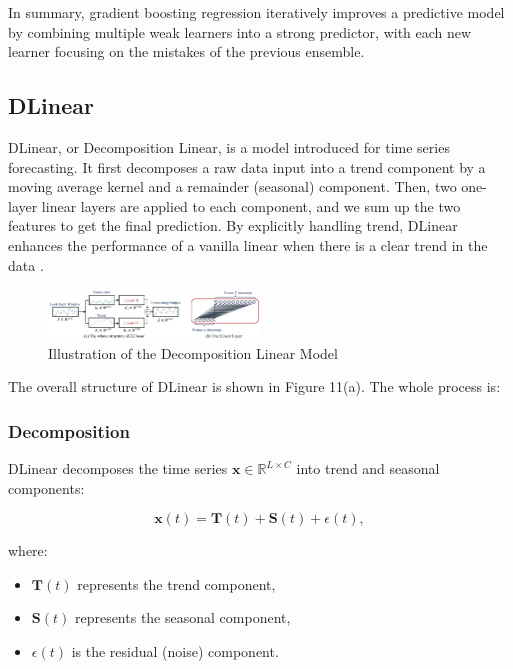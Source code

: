 \documentclass{ieeeojies}
\begin{document}
In summary, gradient boosting regression iteratively improves a predictive model by combining multiple weak learners into a strong predictor, with each new learner focusing on the mistakes of the previous ensemble.
\subsection{DLinear}
DLinear, or Decomposition Linear, is a model introduced for time series forecasting.  It first decomposes a raw data input into a trend component by a moving average kernel and a remainder (seasonal) component. Then, two
one-layer linear layers are applied to each component,
and we sum up the two features to get the final prediction. By explicitly handling trend, DLinear enhances
the performance of a vanilla linear when there is a clear
trend in the data \cite{b15}.

\begin{figure} [H]
    \centering
    \includegraphics[width=0.5\textwidth]{bibliography/Figure/Illu_DLinear.png}
    \caption{Illustration of the Decomposition Linear Model}
    \label{fig:DLinear Illustration}
\end{figure}

The overall structure of DLinear is shown in Figure 11(a). The whole process is:

\subsubsection{Decomposition}
DLinear decomposes the time series $\mathbf{x} \in \mathbb{R}^{L \times C}$ into trend and seasonal components:

\begin{equation}
    \mathbf{x}(t) = \mathbf{T}(t) + \mathbf{S}(t) + \epsilon(t),
\end{equation}

where:
\begin{itemize}
    \item $\mathbf{T}(t)$ represents the trend component,
    \item $\mathbf{S}(t)$ represents the seasonal component,
    \item $\epsilon(t)$ is the residual (noise) component.
\end{itemize}
\end{document}
